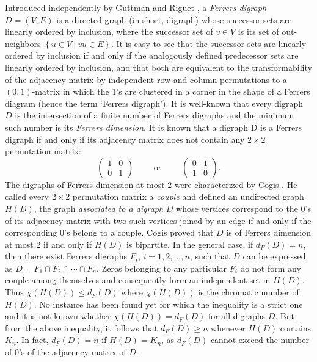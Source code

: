\documentclass[11pt]{article}
\theoremstyle{definition}
\theoremstyle{remark}
\numberwithin{equation}{section}
\newcommand{\set}[1]{\left\{#1\right\}}
\newcommand{\Set}[2]{\set{#1\ \vert\ #2}}
\begin{document}
\vspace{1 em} Introduced independently by Guttman \cite{G} and Riguet \cite{R}, a {\em Ferrers digraph} $D = (V, E)$ is a directed graph (in short, digraph) whose successor sets are linearly ordered by inclusion, where the successor set of $v \in V$ is its set of out-neighbors $\Set{u \in V}{vu \in E}$. It is easy to see that the successor sets are linearly ordered by inclusion if and only if the analogously defined predecessor sets are linearly ordered by inclusion, and that both are equivalent to the transformability of the adjacency matrix by independent row and column permutations to a $(0,1)$-matrix in which the 1's are clustered in a corner in the shape of a Ferrers diagram (hence the term `Ferrers digraph'). It is well-known that every digraph $D$ is the intersection of a finite number of Ferrers digraphs and the minimum such number is its {\em Ferrers dimension}. It is known \cite{R} that a digraph D is a Ferrers digraph if and only if its adjacency matrix does not contain any $2\times 2$ permutation matrix:
$$\left(
\begin{array}{cc}
1 & 0\\
0 & 1
\end{array}
\right)
\qquad \textrm{ or }\qquad
\left(
\begin{array}{cc}
0 & 1\\
1 & 0
\end{array}
\right).$$
The digraphs of Ferrers dimension at most 2 were characterized by Cogis \cite{C}. He called every $2\times 2$ permutation matrix a {\em couple} and defined an undirected graph $H(D)$, the graph {\em associated to a digraph} $D$ whose vertices correspond to the 0's of its adjacency matrix with two such vertices joined by an edge if and only if the corresponding 0's belong to a couple. Cogis \cite{C} proved that $D$ is of Ferrers dimension at most 2 if and only if $H(D)$ is bipartite. In the general case, if $d_F(D) = n$, then there exist Ferrers digraphs $F_i$, $i = 1, 2, \ldots , n$, such that $D$ can be expressed as $D = F_1 \cap F_2 \cap \cdots \cap F_n$. Zeros belonging to any particular $F_i$ do not form any couple among themselves and consequently form an independent set in $H(D)$. Thus $\chi(H(D)) \leq d_F(D)$ where $\chi(H(D))$ is the chromatic number of $H(D)$. No instance has been found yet for which the inequality is a strict one and it is not known whether $\chi(H(D)) = d_F(D)$ for all digraphs $D$. But from the above inequality, it follows that $d_F(D)\geqslant n$ whenever $H(D)$ contains $K_n$. In fact, $d_F(D)=n$ if $H(D)=K_n$, as $d_F(D)$ cannot exceed the number of $0$'s of the adjacency matrix of $D$.
\end{document}
